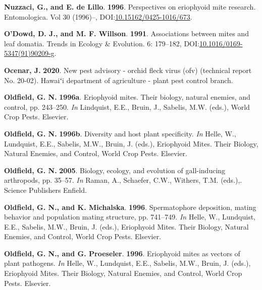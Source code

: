 \documentclass[12pt,final,CPage]{ufthesis}
\newlength{\cslhangindent}
\newenvironment{CSLReferences}[2] %
{%
	\setlength{\parindent}{0pt}
	\ifodd #1 \everypar{\setlength{\hangindent}{\cslhangindent}}\ignorespaces\fi
	\ifnum #2 > 0
	\setlength{\parskip}{#2\baselineskip}
	\fi
}%
{}
\begin{document}
{\begin{CSLReferences}{1}{0}
  \leavevmode{}%
  \textbf{Nuzzaci, G., and E. de Lillo}. \textbf{1996}. Perspectives on eriophyoid mite research. Entomologica. Vol 30 (1996)--, DOI:\href{https://doi.org/10.15162/0425-1016/673}{10.15162/0425-1016/673}.

  \leavevmode{}%
  \textbf{O'Dowd, D. J., and M. F. Willson}. \textbf{1991}. Associations between mites and leaf domatia. Trends in Ecology {\&} Evolution. 6: 179--182, DOI:\href{https://doi.org/10.1016/0169-5347(91)90209-g}{10.1016/0169-5347(91)90209-g}.

  \leavevmode{}%
  \textbf{Ocenar, J.} \textbf{2020}. New pest advisory - orchid fleck virus (ofv) (technical report No. 20-02). Hawaiʻi department of agriculture - plant pest control branch.

  \leavevmode{}%
  \textbf{Oldfield, G. N.} \textbf{1996a}. Eriophyoid mites. Their biology, natural enemies, and control, pp. 243--250. \emph{In} Lindquist, E.E., Bruin, J., Sabelis, M.W. (eds.), World Crop Pests. Elsevier.

  \leavevmode{}%
  \textbf{Oldfield, G. N.} \textbf{1996b}. Diversity and host plant specificity. \emph{In} Helle, W., Lundquist, E.E., Sabelis, M.W., Bruin, J. (eds.), Eriophyoid Mites. Their Biology, Natural Enemies, and Control, World Crop Pests. Elsevier.

  \leavevmode{}%
  \textbf{Oldfield, G. N.} \textbf{2005}. Biology, ecology, and evolution of gall-inducing arthropods, pp. 35--57. \emph{In} Raman, A., Schaefer, C.W., Withers, T.M. (eds.),. Science Publishers Enfield.

  \leavevmode{}%
  \textbf{Oldfield, G. N., and K. Michalska}. \textbf{1996}. Spermatophore deposition, mating behavior and population mating structure, pp. 741--749. \emph{In} Helle, W., Lundquist, E.E., Sabelis, M.W., Bruin, J. (eds.), Eriophyoid Mites. Their Biology, Natural Enemies, and Control, World Crop Pests. Elsevier.

  \leavevmode{}%
  \textbf{Oldfield, G. N., and G. Proeseler}. \textbf{1996}. Eriophyoid mites as vectors of plant pathogens. \emph{In} Helle, W., Lundquist, E.E., Sabelis, M.W., Bruin, J. (eds.), Eriophyoid Mites. Their Biology, Natural Enemies, and Control, World Crop Pests. Elsevier.


\end{CSLReferences}}
\end{document}
